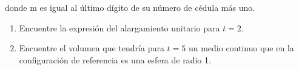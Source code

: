 \documentclass[12pt,a4paper]{article}
\begin{document}
\begin{enumerate}
   donde m es igual al último dígito de su número de cédula más uno.
   \begin{enumerate}
       \item Encuentre la expresión del alargamiento unitario para $t=2$.
       \item Encuentre el volumen que tendría para $t=5$ un medio continuo que en la
       configuración de referencia es una esfera de radio 1.
   \end{enumerate}

\end{enumerate}
\end{document}
